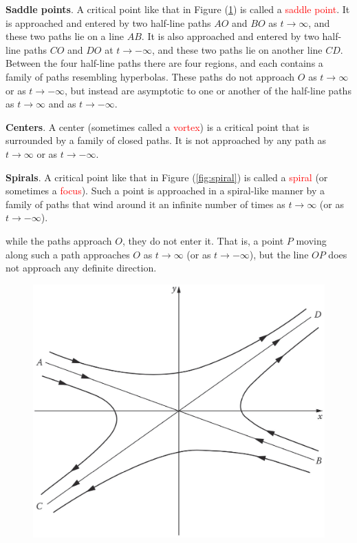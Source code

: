 \documentclass[12pt,a4paper]{article}
\begin{document}
\textbf{Saddle points}. A critical point like that in Figure (\ref{fig:saddle}) is called a \textcolor{red}{saddle point}. It is approached and entered by two half-line paths $AO$ and $BO$ as $t \rightarrow \infty$, and these two paths lie on a line $AB$. It is also approached and entered by two half-line paths $CO$ and $DO$ at $t \rightarrow -\infty$, and these two paths lie on another line $CD$. Between the four half-line paths there are four regions, and each contains a family of paths resembling hyperbolas. These paths do not approach $O$ as $t \rightarrow \infty$ or as $t \rightarrow -\infty$, but instead are asymptotic to one or another of the half-line paths as $t \rightarrow \infty$ and as $t \rightarrow -\infty$.


\textbf{Centers}. A center (sometimes called a \textcolor{red}{vortex}) is a critical point that is surrounded by a family of closed paths. It is not approached by any path as $t \rightarrow \infty$ or as $t \rightarrow -\infty$.

\textbf{Spirals}. A critical point like that in Figure (\ref{fig:spiral}) is called a \textcolor{red}{spiral} (or sometimes a \textcolor{red}{focus}). Such a point is approached in a spiral-like manner by a family of paths that wind around it an infinite number of times as $t \rightarrow \infty$ (or as $t \rightarrow -\infty$).

while the paths approach $O$, they do not enter it. That is, a point $P$ moving along such a path approaches $O$ as $t \rightarrow \infty$ (or as $t \rightarrow -\infty$), but the line $OP$ does not approach any definite direction.

\begin{figure}
\centering
\includegraphics[height=9.cm, angle=0]{saddle.eps}
\caption{
}
\label{fig:saddle}
\end{figure}
\end{document}
